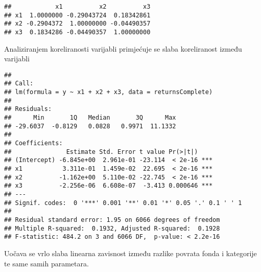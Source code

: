 \documentclass[
]{article}
\newenvironment{Shaded}{\begin{snugshade}}{\end{snugshade}}
\newcommand{\DataTypeTok}[1]{\textcolor[rgb]{0.13,0.29,0.53}{#1}}
\newcommand{\KeywordTok}[1]{\textcolor[rgb]{0.13,0.29,0.53}{\textbf{#1}}}
\newcommand{\NormalTok}[1]{#1}
\newcommand{\OperatorTok}[1]{\textcolor[rgb]{0.81,0.36,0.00}{\textbf{#1}}}
\newcommand{\StringTok}[1]{\textcolor[rgb]{0.31,0.60,0.02}{#1}}
\begin{document}
\begin{verbatim}
##            x1          x2          x3
## x1  1.0000000 -0.29043724  0.18342861
## x2 -0.2904372  1.00000000 -0.04490357
## x3  0.1834286 -0.04490357  1.00000000
\end{verbatim}

Analiziranjem koreliranosti varijabli primjećuje se slaba koreliranost
između varijabli

\begin{Shaded}
\end{Shaded}

\begin{verbatim}
## 
## Call:
## lm(formula = y ~ x1 + x2 + x3, data = returnsComplete)
## 
## Residuals:
##      Min       1Q   Median       3Q      Max 
## -29.6037  -0.8129   0.0828   0.9971  11.1332 
## 
## Coefficients:
##               Estimate Std. Error t value Pr(>|t|)    
## (Intercept) -6.845e+00  2.961e-01 -23.114  < 2e-16 ***
## x1           3.311e-01  1.459e-02  22.695  < 2e-16 ***
## x2          -1.162e+00  5.110e-02 -22.745  < 2e-16 ***
## x3          -2.256e-06  6.608e-07  -3.413 0.000646 ***
## ---
## Signif. codes:  0 '***' 0.001 '**' 0.01 '*' 0.05 '.' 0.1 ' ' 1
## 
## Residual standard error: 1.95 on 6066 degrees of freedom
## Multiple R-squared:  0.1932, Adjusted R-squared:  0.1928 
## F-statistic: 484.2 on 3 and 6066 DF,  p-value: < 2.2e-16
\end{verbatim}

Uočava se vrlo slaba linearna zavisnost između razlike povrata fonda i
kategorije te same samih parametara.
\end{document}
